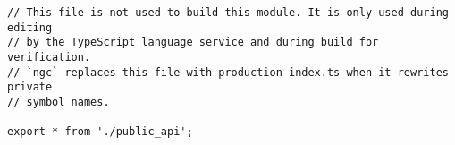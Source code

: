 \begin{verbatim}
// This file is not used to build this module. It is only used during editing
// by the TypeScript language service and during build for verification.
// `ngc` replaces this file with production index.ts when it rewrites private
// symbol names.

export * from './public_api';
\end{verbatim}
